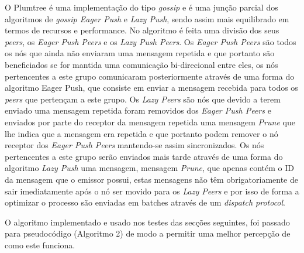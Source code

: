 O Plumtree é uma implementação do tipo \textit{gossip} e é uma junção parcial dos algoritmos de \textit{gossip Eager Push} e \textit{Lazy Push}, sendo assim mais equilibrado em termos de recursos e performance.
No algoritmo é feita uma divisão dos seus \textit{peers}, os \textit{Eager Push Peers} e os \textit{Lazy Push Peers}. 
Os \textit{Eager Push Peers} são todos os nós que ainda não enviaram uma mensagem repetida e que portanto são beneficiados se for mantida uma comunicação bi-direcional entre eles, os nós pertencentes a este grupo comunicaram posteriormente através de uma forma do algoritmo Eager Push, que consiste em enviar a mensagem recebida para todos os \textit{peers} que pertençam a este grupo.
Os \textit{Lazy Peers} são nós que devido a terem enviado uma mensagem repetida foram removidos dos \textit{Eager Push Peers} e enviados por parte do receptor da mensagem repetida uma mensagem \textit{Prune} que lhe indica que a mensagem era repetida e que portanto podem remover o nó receptor dos \textit{Eager Push Peers} mantendo-se assim sincronizados. Os nós pertencentes a este grupo serão enviados mais tarde através de uma forma do algoritmo \textit{Lazy Push} uma mensagem, mensagem \textit{Prune},  que apenas contém o ID da mensagem que o emissor possui, estas mensagens não têm obrigatoriamente de sair imediatamente após o nó ser movido para os \textit{Lazy Peers} e por isso de forma a optimizar o processo são enviadas em batches através de um \textit{dispatch protocol}.

O algoritmo implementado e usado nos testes das secções seguintes, foi passado para pseudocódigo (Algoritmo 2) de modo a permitir uma melhor percepção de como este funciona.

